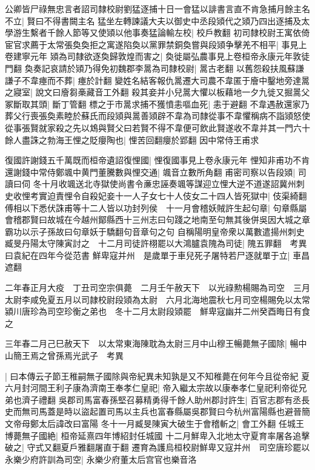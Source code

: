 公卿皆尸祿無忠言者詔司隸校尉劉猛逐捕十日一會猛以誹書言直不肯急捕月餘主名不立|{
	賢曰不得書闕主名}
猛坐左轉諫議大夫以御史中丞段熲代之熲乃四出逐捕及太學游生繫者千餘人節等又使熲以他事奏猛論輸左校|{
	校戶教翻}
初司隸校尉王寓依倚宦官求薦于太常張奐奐拒之寓遂陷奐以黨罪禁銅奐嘗與段熲争擊羌不相平|{
	事見上卷建寧元年}
熲為司隸欲逐奐歸敦煌而害之|{
	奐徙屬弘農事見上卷桓帝永康元年敦徒門翻}
奐奏記哀請於熲乃得免初魏郡李暠為司隸校尉|{
	暠古老翻}
以舊怨殺扶風蘇謙謙子不韋瘞而不葬|{
	瘞於計翻}
變姓名結客報仇暠遷大司農不韋匿于廥中鑿地旁達暠之寢室|{
	說文曰廥芻槀藏音工外翻}
殺其妾并小兒暠大懼以板藉地一夕九徙又掘暠父冢斷取其頭|{
	斷丁管翻}
標之于市暠求捕不獲憤恚嘔血死|{
	恚于避翻}
不韋遇赦還家乃葬父行喪張奐素睦於蘇氏而段熲與暠善熲辟不韋為司隸從事不韋懼稱病不詣熲怒使從事張賢就家殺之先以鴆與賢父曰若賢不得不韋便可飲此賢遂收不韋并其一門六十餘人盡誅之勃海王悝之貶癭陶也|{
	悝苦回翻癭於郢翻}
因中常侍王甫求

復國許謝錢五千萬既而桓帝遺詔復悝國|{
	悝復國事見上卷永康元年}
悝知非甫功不肯還謝錢中常侍鄭颯中黄門董騰數與悝交通|{
	颯音立數所角翻}
甫密司察以告段熲|{
	司讀曰伺}
冬十月收颯送北寺獄使尚書令亷忠誣奏颯等謀迎立悝大逆不道遂詔冀州刺史收悝考實迫責悝令自殺妃妾十一人子女七十人伎女二十四人皆死獄中|{
	伎渠綺翻}
傅相以下悉伏誅甫等十二人皆以功封列侯　十一月會稽妖賊許生起句章|{
	句章縣屬會稽郡賢曰故城在今越州鄮縣西十三州志曰句踐之地南至句無其後併吳因大城之章霸功以示子孫故曰句章妖于驕翻句音章句之句}
自稱陽明皇帝衆以萬數遣揚州刺史臧旻丹陽太守陳寅討之　十二月司徒許栩罷以大鴻臚袁隗為司徒|{
	隗五罪翻　考異曰袁紀在四年今從范書}
鮮卑寇并州　是歲單于車兒死子屠特若尸逐就單于立|{
	車昌遮翻}


二年春正月大疫　丁丑司空宗俱薨　二月壬午赦天下　以光祿勲楊賜為司空　三月太尉李咸免夏五月以司隷校尉段熲為太尉　六月北海地震秋七月司空楊賜免以太常潁川唐珍為司空珍衡之弟也　冬十二月太尉段熲罷　鮮卑寇幽并二州癸酉晦日有食之

三年春二月己巳赦天下　以太常東海陳耽為太尉三月中山穆王暢薨無子國除|{
	暢中山簡王焉之曾孫焉光武子　考異}


|{
	曰本傳云子節王稚嗣無子國除與帝紀異未知孰是又不知稚薨在何年今且從帝紀}
夏六月封河間王利子康為濟南王奉孝仁皇祀|{
	帝入繼太宗故以康奉孝仁皇祀利帝從兄弟也濟子禮翻}
吳郡司馬富春孫堅召募精勇得千餘人助州郡討許生|{
	百官志郡有丞長史而無司馬蓋是時以盜起置司馬以主兵也富春縣屬吳郡賢曰今杭州富陽縣也避晉簡文帝母鄭太后諱改曰富陽}
冬十一月臧旻陳寅大破生于會稽斬之|{
	會工外翻}
任城王博薨無子國絶|{
	桓帝延熹四年博紹封任城國}
十二月鮮卑入北地太守夏育率屠各追擊破之|{
	守式又翻夏戶雅翻屠直于翻}
遷育為護烏桓校尉鮮卑又寇并州　司空唐珍罷以永樂少府許訓為司空|{
	永樂少府董太后宫官也樂音洛}


